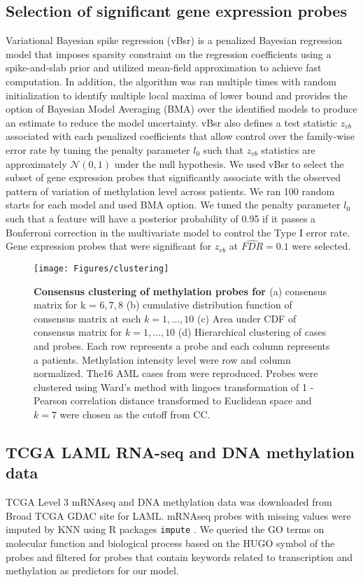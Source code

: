 \documentclass{article}
\begin{document}
\subsection{Selection of significant gene expression probes}
Variational Bayesian spike regression (vBsr) \cite{logsdon2012novel} is a penalized Bayesian regression model that imposes sparsity constraint on the regression coefficients using a spike-and-slab prior and utilized mean-field approximation to achieve fast computation. In addition, the algorithm was ran multiple times with random initialization to identify multiple local maxima of lower bound and provides the option of Bayesian Model Averaging (BMA) over the identified models to produce an estimate to reduce the model uncertainty. vBsr also defines a test statistic $z_{vb}$ associated with each penalized coefficients that allow control over the family-wise error rate by tuning the penalty parameter $l_0$ such that $z_{vb}$ statistics are approximately $\mathcal{N}(0, 1)$ under the null hypothesis. We used vBsr to select the subset of gene expression probes that significantly associate with the observed pattern of variation of methylation level across patients. We ran 100 random starts for each model and used BMA option. We tuned the penalty parameter $l_0$ such that a feature will have a posterior probability of 0.95 if it passes a Bonferroni correction in the multivariate model to control the Type I error rate. Gene expression probes that were significant for $z_{vb}$ at $\widehat{FDR} = 0.1$ were selected. 

\begin{figure*}[htb!]
\centering
\texttt{[image: Figures/clustering]}
\caption{\textbf{Consensus clustering of methylation probes for \citet{figueroa2010dna}} (a) consensus matrix for k = $6, 7, 8$ (b) cumulative distribution function of consensus matrix at each $k = 1, \dots, 10$ (c) Area under CDF of consensus matrix for $k = 1, \dots, 10$ (d) Hierarchical clustering of cases and probes. Each row represents a probe and each column represents a patients. Methylation intensity level were row and column normalized. The16 AML cases from \citet{figueroa2010dna} were reproduced. Probes were clustered using Ward's method with lingoes transformation of 1 - Pearson correlation distance transformed to Euclidean space and $k=7$ were chosen as the cutoff from CC.}
\label{CC}
\end{figure*}

\subsection{TCGA LAML RNA-seq and DNA methylation data}
TCGA Level 3 mRNAseq and DNA methylation data was downloaded from Broad TCGA GDAC site for LAML. mRNAseq probes with missing values were imputed by KNN using R packages \texttt{impute} \citep{hastie2001impute}. We queried the GO terms on molecular function and biological process based on the HUGO symbol of the probes and filtered for probes that contain keywords related to transcription and methylation as predictors for our model.   
\end{document}

